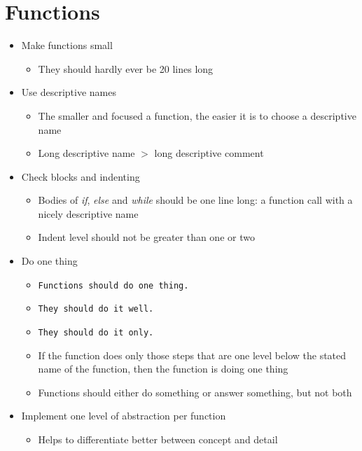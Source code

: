
\section{Functions}
\begin{itemize}
    \item Make functions small
    \begin{itemize}
        \item They should hardly ever be 20 lines long
    \end{itemize}
    \item Use descriptive names
    \begin{itemize}
        \item The smaller and focused a function, the easier it is to choose a descriptive name
        \item Long descriptive name $>$ long descriptive comment
    \end{itemize}
    \item Check blocks and indenting
    \begin{itemize}
        \item Bodies of \textit{if}, \textit{else} and \textit{while} should be one line long:
        a function call with a nicely descriptive name
        \item Indent level should not be greater than one or two
    \end{itemize}
    \item Do one thing
    \begin{itemize}
        \item \texttt{Functions should do one thing.}
        \item [] \texttt{They should do it well.}
        \item [] \texttt{They should do it only.}
        \item If the function does only those steps that are one level below the stated name of the function,
        then the function is doing one thing
        \item Functions should either do something or answer something, but not both
    \end{itemize}
    \item Implement one level of abstraction per function
    \begin{itemize}
        \item Helps to differentiate better between concept and detail
    \end{itemize}

\end{itemize}

